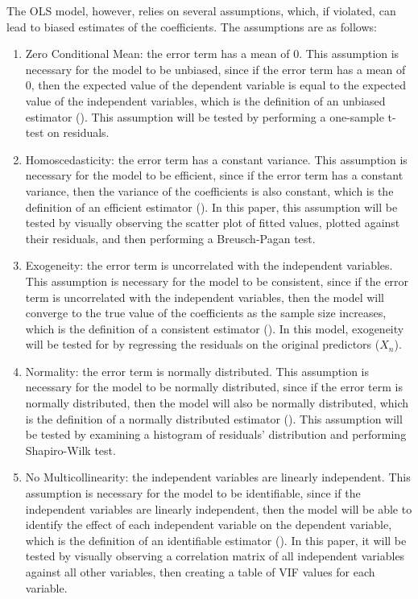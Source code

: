 \documentclass[12pt]{report}
\begin{document}
The OLS model, however, relies on several assumptions, which, if violated, can lead to biased estimates of the coefficients. The assumptions are as follows:
\begin{enumerate}
	\item Zero Conditional Mean: the error term has a mean of 0. This assumption is necessary for the model to be unbiased, since if the error term has a mean of 0, then the expected value of the dependent variable is equal to the expected value of the independent variables, which is the definition of an unbiased estimator (\cite{Crudu2022}). This assumption will be tested by performing a one-sample t-test on residuals.
	\item Homoscedasticity: the error term has a constant variance. This assumption is necessary for the model to be efficient, since if the error term has a constant variance, then the variance of the coefficients is also constant, which is the definition of an efficient estimator (\cite{Yang2019}). In this paper, this assumption will be tested by visually observing the scatter plot of fitted values, plotted against their residuals, and then performing a Breusch-Pagan test.
	\item Exogeneity: the error term is uncorrelated with the independent variables. This assumption is necessary for the model to be consistent, since if the error term is uncorrelated with the independent variables, then the model will converge to the true value of the coefficients as the sample size increases, which is the definition of a consistent estimator (\cite[p. 95]{Baltagi2011}). In this model, exogeneity will be tested for by regressing the residuals on the original predictors ($X_n$).
	\item Normality: the error term is normally distributed. This assumption is necessary for the model to be normally distributed, since if the error term is normally distributed, then the model will also be normally distributed, which is the definition of a normally distributed estimator (\cite{schmidt2018}). This assumption will be tested by examining a histogram of residuals' distribution and performing Shapiro-Wilk test.
	\item No Multicollinearity: the independent variables are linearly independent. This assumption is necessary for the model to be identifiable, since if the independent variables are linearly independent, then the model will be able to identify the effect of each independent variable on the dependent variable, which is the definition of an identifiable estimator (\cite{shrestha2020}). In this paper, it will be tested by visually observing a correlation matrix of all independent variables against all other variables, then creating a table of VIF values for each variable.
\end{enumerate}
\end{document}
